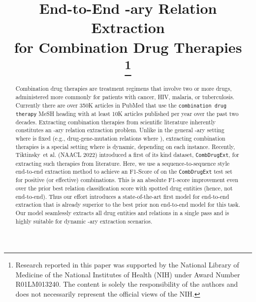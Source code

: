 \documentclass[conference]{IEEEtran}
\begin{document}
\title{ End-to-End  -ary Relation Extraction \\ for Combination Drug Therapies\\

\thanks{Research reported in this paper was supported by the National Library of Medicine of the National Institutes of Health (NIH) under Award Number R01LM013240. The content is solely the responsibility of the authors and does not necessarily represent the official views of the NIH.}
}

\author{
\and
{}
}

\maketitle

\begin{abstract}
Combination drug therapies are treatment regimens that involve two or more drugs, administered more commonly for patients with cancer, HIV, malaria, or tuberculosis. Currently there are over 350K articles in PubMed that use the {\color{blue} \texttt{combination drug therapy}} MeSH heading with at least 10K articles published per year over the past two decades. Extracting combination therapies from scientific literature inherently constitutes an  -ary relation extraction problem. Unlike in the general -ary setting where  is fixed (e.g., drug-gene-mutation relations where ),  extracting combination therapies is a special setting where  is dynamic, depending on each instance. Recently, Tiktinsky~et al. (NAACL 2022) introduced a first of its kind dataset, \texttt{CombDrugExt}, for extracting such therapies from literature. Here, we use a sequence-to-sequence style end-to-end extraction method to achieve an F1-Score of  on the \texttt{CombDrugExt} test set for positive (or effective) combinations. This is an absolute  F1-score improvement even over the prior best relation classification  score with spotted drug entities (hence, not end-to-end). Thus our effort introduces a state-of-the-art first model for end-to-end extraction that is already superior to the best prior non end-to-end model for this task. Our model seamlessly extracts all drug entities and relations in a single pass and is highly suitable for dynamic -ary extraction scenarios. 

\end{abstract}
\end{document}
